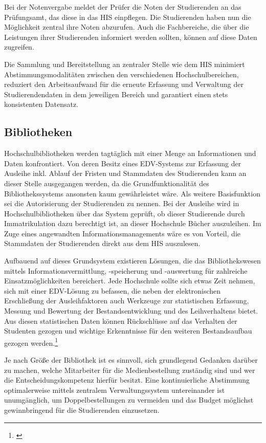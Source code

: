Bei der Notenvergabe meldet der Prüfer die Noten der Studierenden an das Prüfungsamt, das diese in das HIS einpflegen. Die Studierenden haben nun die Möglichkeit zentral ihre Noten abzurufen. Auch die Fachbereiche, die über die Leistungen ihrer Studierenden informiert werden sollten, können auf diese Daten zugreifen. 

Die Sammlung und Bereitstellung an zentraler Stelle wie dem HIS minimiert Abstimmungsmodalitäten zwischen den verschiedenen Hochschulbereichen, reduziert den Arbeitsaufwand für die erneute Erfassung und Verwaltung der Studierendendaten in dem jeweiligen Bereich und garantiert einen stets konsistenten Datensatz. 

\subsection{Bibliotheken}
Hochschulbibliotheken werden tagtäglich mit einer Menge an Informationen und Daten konfrontiert. Von deren Besitz eines EDV-Systems zur Erfassung der Ausleihe inkl. Ablauf der Fristen und Stammdaten des Studierenden kann an dieser Stelle ausgegangen werden, da die Grundfunktionalität des Bibliothekssystems ansonsten kaum gewährleistet wäre. Als weitere Basisfunktion sei die Autorisierung der Studierenden zu nennen. Bei der Ausleihe wird in Hochschulbibliotheken über das System geprüft, ob dieser Studierende durch Immatrikulation dazu berechtigt ist, an dieser Hochschule Bücher auszuleihen. 
Im Zuge eines angewandten Informationsmanagements wäre es von Vorteil, die Stammdaten der Studierenden direkt aus dem HIS auszulesen. 

Aufbauend auf dieses Grundsystem existieren Lösungen, die das Bibliothekswesen mittels Informationsvermittlung, -speicherung und -auswertung für zahlreiche Einsatzmöglichkeiten bereichert. Jede Hochschule sollte sich etwas Zeit nehmen, sich mit einer EDV-Lösung zu befassen, die neben der elektronischen Erschließung der Ausleihfaktoren auch Werkzeuge zur statistischen Erfassung, Messung und Bewertung der Bestandsentwicklung und des Leihverhaltens bietet. Aus diesen statistischen Daten können Rückschlüsse auf das Verhalten der Studenten gezogen und wichtige Erkenntnisse für den weiteren Bestandsaufbau gezogen werden.\footnote{\cite{merkle_aufbau_2004}}

Je nach Größe der Bibliothek ist es sinnvoll, sich grundlegend Gedanken darüber zu machen, welche Mitarbeiter für die Medienbestellung zuständig sind und wer die Entscheidungskompetenz hierfür besitzt. Eine kontinuierliche Abstimmung optimalerweise mittels zentralem Verwaltungssystem untereinander ist unumgänglich, um Doppelbestellungen zu vermeiden und das Budget möglichst gewinnbringend für die Studierenden einzusetzen. 

